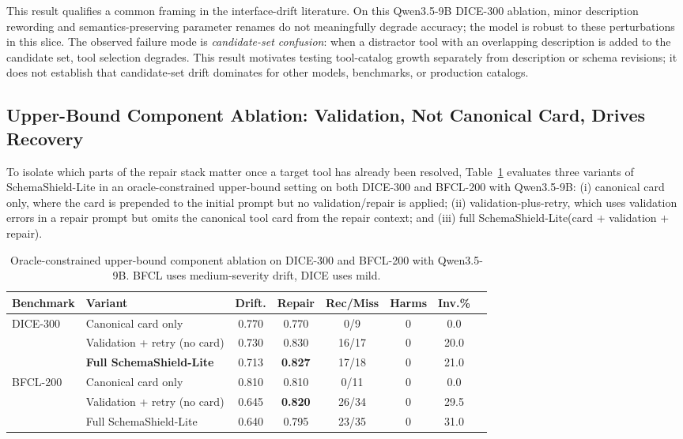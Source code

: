 \documentclass{llncs}
\newcommand{\method}{SchemaShield-Lite\xspace}
\begin{document}
This result qualifies a common framing in the interface-drift literature. On this
Qwen3.5-9B DICE-300 ablation, minor description rewording and
semantics-preserving parameter renames do not meaningfully degrade accuracy; the
model is robust to these perturbations in this slice. The observed
failure mode is \emph{candidate-set confusion}: when a distractor tool with an
overlapping description is added to the candidate set, tool selection degrades.
This result motivates testing tool-catalog growth separately from description or
schema revisions; it does not establish that candidate-set drift dominates for
other models, benchmarks, or production catalogs.

\subsection{Upper-Bound Component Ablation: Validation, Not Canonical Card, Drives Recovery}
\label{sec:component-ablation}
To isolate which parts of the repair stack matter once a target tool has already
been resolved, Table~\ref{tab:component-ablation} evaluates three variants of
\method in an oracle-constrained upper-bound setting on both DICE-300 and BFCL-200
with Qwen3.5-9B: (i) canonical card only, where the card is prepended to the
initial prompt but no validation/repair is applied; (ii) validation-plus-retry,
which uses validation errors in a repair prompt but omits the canonical tool card
from the repair context; and (iii) full \method (card + validation + repair).

\begin{table}[t]
\caption{Oracle-constrained upper-bound component ablation on DICE-300 and
BFCL-200 with Qwen3.5-9B. BFCL uses medium-severity drift, DICE uses mild.}
\label{tab:component-ablation}
\centering
\small
\begin{tabular}{llcccccc}
\toprule
Benchmark & Variant & Drift. & Repair & Rec/Miss & Harms & Inv.\% \\
\midrule
\multirow{3}{*}{DICE-300}
& Canonical card only            & 0.770 & 0.770 & 0/9   & 0 & 0.0 \\
& Validation + retry (no card)   & 0.730 & 0.830 & 16/17 & 0 & 20.0 \\
& \textbf{Full \method}          & 0.713 & \textbf{0.827} & 17/18 & 0 & 21.0 \\
\midrule
\multirow{3}{*}{BFCL-200}
& Canonical card only            & 0.810 & 0.810 & 0/11  & 0 & 0.0 \\
& Validation + retry (no card)   & 0.645 & \textbf{0.820} & 26/34 & 0 & 29.5 \\
& Full \method                   & 0.640 & 0.795 & 23/35 & 0 & 31.0 \\
\bottomrule
\end{tabular}
\end{table}
\end{document}
